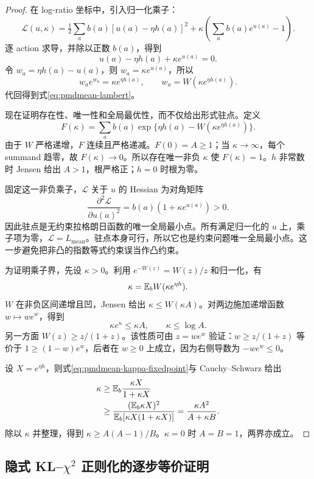 \begin{proof}
在 log-ratio 坐标中，引入归一化乘子：
\[
 \mathcal L(u,\kappa)=\tfrac12\sum_ab(a)[u(a)-\eta h(a)]^2
 +\kappa\left(\sum_ab(a)e^{u(a)}-1\right).
\]
逐 action 求导，并除以正数 $b(a)$，得到
\begin{equation}
 u(a)-\eta h(a)+\kappa e^{u(a)}=0.
 \label{eq:pmdmean-stationarity}
\end{equation}
令 $w_a=\eta h(a)-u(a)$，则 $w_a=\kappa e^{u(a)}$，所以
\[
 w_ae^{w_a}=\kappa e^{\eta h(a)},\qquad
 w_a=W(\kappa e^{\eta h(a)}).
\]
代回得到式\eqref{eq:pmdmean-lambert}。

现在证明存在性、唯一性和全局最优性，而不仅给出形式驻点。定义
\[
 F(\kappa)=\sum_ab(a)\exp\{\eta h(a)-W(\kappa e^{\eta h(a)})\}.
\]
由于 $W$ 严格递增，$F$ 连续且严格递减。$F(0)=A\geq1$；当 $\kappa\to\infty$，每个 summand 趋零，故 $F(\kappa)\to0$。所以存在唯一非负 $\kappa$ 使 $F(\kappa)=1$。$h$ 非常数时 Jensen 给出 $A>1$，根严格正；$h=0$ 时根为零。

固定这一非负乘子，$\mathcal L$ 关于 $u$ 的 Hessian 为对角矩阵
\[
 \frac{\partial^2\mathcal L}{\partial u(a)^2}=b(a)(1+\kappa e^{u(a)})>0.
\]
因此驻点是无约束拉格朗日函数的唯一全局最小点。所有满足归一化的 $u$ 上，乘子项为零，$\mathcal L=L_{\mathrm{mean}}$。驻点本身可行，所以它也是约束问题唯一全局最小点。这一步避免把非凸的指数等式约束误当作凸约束。

为证明乘子界，先设 $\kappa>0$。利用 $e^{-W(z)}=W(z)/z$ 和归一化，有
\begin{equation}
 \kappa=\mathbb{E}_bW(\kappa e^{\eta h}).
 \label{eq:pmdmean-kappa-fixedpoint}
\end{equation}
$W$ 在非负区间递增且凹，Jensen 给出 $\kappa\leq W(\kappa A)$。对两边施加递增函数 $w\mapsto we^w$，得到
\[
 \kappa e^\kappa\leq\kappa A,\qquad\kappa\leq\log A.
\]
另一方面 $W(z)\geq z/(1+z)$。该性质可由 $z=we^w$ 验证：$w\geq z/(1+z)$ 等价于 $1\geq(1-w)e^w$，后者在 $w\geq0$ 上成立，因为右侧导数为 $-we^w\leq0$。

设 $X=e^{\eta h}$，则式\eqref{eq:pmdmean-kappa-fixedpoint}与 Cauchy--Schwarz 给出
\begin{align*}
 \kappa&\geq\mathbb{E}_b\frac{\kappa X}{1+\kappa X}\\
 &\geq\frac{(\mathbb{E}_b\kappa X)^2}{\mathbb{E}_b[\kappa X(1+\kappa X)]}
 =\frac{\kappa A^2}{A+\kappa B}.
\end{align*}
除以 $\kappa$ 并整理，得到 $\kappa\geq A(A-1)/B$。$\kappa=0$ 时 $A=B=1$，两界亦成立。
\end{proof}

\subsection{隐式 KL--$\chi^2$ 正则化的逐步等价证明}

